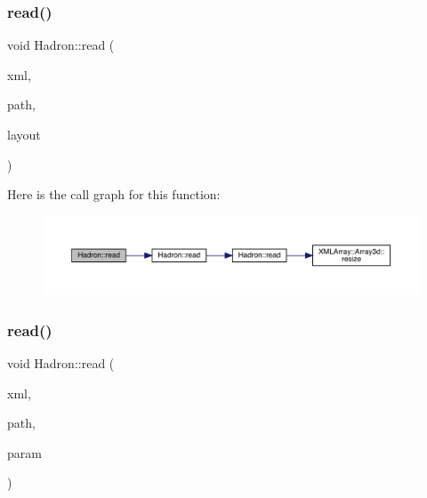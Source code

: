 \subsubsection{\texorpdfstring{read()}{read()}\hspace{0.1cm}{\footnotesize\ttfamily [5/94]}}
{\footnotesize\ttfamily void Hadron\+::read (\begin{DoxyParamCaption}\item[{\mbox{\hyperlink{classADATXML_1_1XMLReader}{X\+M\+L\+Reader}} \&}]{xml,  }\item[{const std\+::string \&}]{path,  }\item[{\mbox{\hyperlink{structHadron_1_1Layout_1_1Layout__t}{Layout\+::\+Layout\+\_\+t}} \&}]{layout }\end{DoxyParamCaption})}

Here is the call graph for this function\+:
\nopagebreak
\begin{figure}[H]
\begin{center}
\leavevmode
\includegraphics[width=350pt]{d1/daf/namespaceHadron_a2c6adb72eb12fa49cb7c0c7d15aa4aba_cgraph}
\end{center}
\end{figure}
\mbox{\label{namespaceHadron_ab8d127a4d4a1ca38aae1b0d45226789e}} 
\subsubsection{\texorpdfstring{read()}{read()}\hspace{0.1cm}{\footnotesize\ttfamily [6/94]}}
{\footnotesize\ttfamily void Hadron\+::read (\begin{DoxyParamCaption}\item[{\mbox{\hyperlink{classADATXML_1_1XMLReader}{X\+M\+L\+Reader}} \&}]{xml,  }\item[{const std\+::string \&}]{path,  }\item[{\mbox{\hyperlink{structHadron_1_1KeyCGCIrrepMom__t}{Key\+C\+G\+C\+Irrep\+Mom\+\_\+t}} \&}]{param }\end{DoxyParamCaption})}



